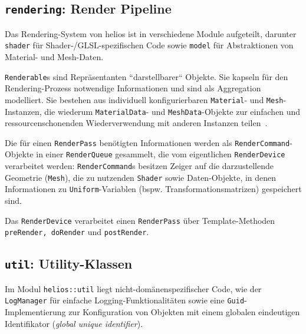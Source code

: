 \subsection*{\texttt{rendering}: Render Pipeline}
Das Rendering-System von helios ist in verschiedene Module aufgeteilt, darunter \texttt{shader} für Shader-/GLSL-spezifischen Code sowie \texttt{model} für Abstraktionen von Material- und Mesh-Daten.\par
\texttt{Renderable}s sind Repräsentanten ``darstellbarer`` Objekte.
Sie kapseln für den Rendering-Prozess notwendige Informationen und sind als Aggregation modelliert.
Sie bestehen aus individuell konfigurierbaren \texttt{Material}- und \texttt{Mesh}-Instanzen, die wiederum \texttt{MaterialData}- und \texttt{MeshData}-Objekte zur einfachen und ressourcenschonenden Wiederverwendung mit anderen Instanzen teilen~\cite[126]{AHHP+18}.\par

Die für einen \texttt{RenderPass} benötigten Informationen werden als \texttt{RenderCommand}-Objekte in einer \texttt{RenderQueue} gesammelt, die vom eigentlichen \texttt{RenderDevice} verarbeitet werden: \texttt{RenderCommand}s besitzen Zeiger auf die darzustellende Geometrie (\texttt{Mesh}), die zu nutzenden \texttt{Shader} sowie Daten-Objekte, in denen Informationen zu \texttt{Uniform}-Variablen (bspw. Transformationsmatrizen) gespeichert sind.\par
Das \texttt{RenderDevice} verarbeitet einen \texttt{RenderPass} über Template-Methoden \texttt{preRender, doRender} und \texttt{postRender}.


\subsection*{\texttt{util}: Utility-Klassen}
Im Modul \texttt{helios::util} liegt nicht-domänenspezifischer Code, wie der \texttt{LogManager} für einfache Logging-Funktionalitäten sowie eine \texttt{Guid}-Implementierung zur Konfiguration von Objekten mit einem globalen eindeutigen Identifikator (\textit{global unique identifier}).